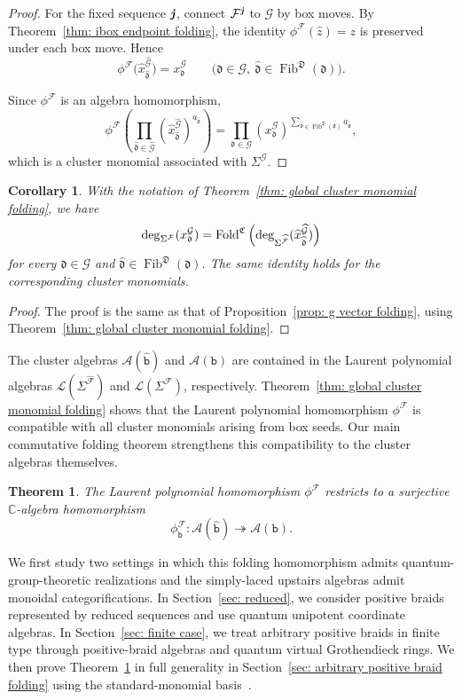 \documentclass[12pt, leqno]{amsart}
\numberwithin{equation}{section}
\theoremstyle{plain}
\newtheorem{theorem}[lemma]{Theorem}
\newtheorem{corollary}[lemma]{Corollary}
\theoremstyle{definition}
\newcommand{\C}{\mathbb{C}}
\newcommand{\Fold}{{\rm Fold}}
\newcommand{\jj}{ \textbf{\textit{j}}}
\newcommand{\Fib}{\operatorname{Fib}}
\newcommand{\hx}{\widehat{x}}
\newcommand{\hz}{\widehat{z}}
\newcommand{\frakC}{\mathfrak{C}}
\newcommand{\frakD}{\mathfrak{D}}
\newcommand{\frakd}{\mathfrak{d}}
\newcommand{\hfrakd}{\widehat{\frakd}}
\newcommand{\calA}{\mathcal{A}}
\newcommand{\calF}{\mathcal{F}}
\newcommand{\calG}{\mathcal{G}}
\newcommand{\calL}{\mathcal{L}}
\newcommand{\hcalF}{{\widehat{\calF}}}
\newcommand{\hcalG}{{\widehat{\calG}}}
\newcommand{\ttb}{\mathtt{b}}
\newcommand{\httb}{\widehat{\ttb}}
\begin{document}
\begin{proof}
For the fixed sequence $\jj$, connect $\calF^\jj$ to $\calG$ by box moves. 
By Theorem~\ref{thm: ibox endpoint folding},  the identity $\phi^\calF(\hz)=z$ is preserved{} under each box move.
Hence
\[
\phi^\calF\bigl(\hx^\hcalG_{\hfrakd}\bigr) =x^\calG_{\frakd}
\qquad
\bigl(\frakd\in\calG,\ \hfrakd\in\Fib^\frakD(\frakd) \bigr).
\]

Since $\phi^\calF$ is an algebra homomorphism,
\[
\phi^\calF\left(\prod_{\hfrakd\in\hcalG}(\hx_{\hfrakd}^{\hcalG})^{a_{\hfrakd}}\right)
= \prod_{\frakd\in\calG} (x_{\frakd}^{\calG})^{\sum_{\hfrakd\in\Fib^\frakD(\frakd)}a_{\hfrakd}},
\]
which is a cluster monomial associated with $\Sigma^\calG$.
\end{proof}

\begin{corollary}\label{cor: global g-vector folding}
With the notation of
Theorem~\ref{thm: global cluster monomial folding}, we have
\[
\deg_{\Sigma^\calF}(x_{\frakd}^{\calG})=\Fold^{\frakC}\left(\deg_{\Sigma^\hcalF}(\hx_{\hfrakd}^{\hcalG})\right)
\]
for every $\frakd\in\calG$ and
$\hfrakd\in\Fib^{\frakD}(\frakd)$.
The same identity holds for the corresponding cluster monomials.
\end{corollary}

\begin{proof}
The proof is the same as that of
Proposition~\ref{prop: g vector folding}, using
Theorem~\ref{thm: global cluster monomial folding}.
\end{proof}

The cluster algebras $\calA(\httb)$ and $\calA(\ttb)$ are
contained in the Laurent polynomial algebras
$\calL(\Sigma^\hcalF)$ and $\calL(\Sigma^\calF)$,
respectively.  Theorem~\ref{thm: global cluster monomial folding}
shows that the Laurent polynomial homomorphism $\phi^\calF$ is
compatible with all cluster monomials arising from box seeds.
Our main commutative folding theorem strengthens this compatibility
to the cluster algebras themselves.

\begin{theorem}\label{thm: cluster algebra folding}
The Laurent polynomial homomorphism $\phi^\calF$ restricts to a
surjective $\C$-algebra homomorphism
\[
\phi^\calF_\ttb:
\calA(\httb)\twoheadrightarrow\calA(\ttb).
\]
\end{theorem}

We first study two settings in which this folding homomorphism admits
quantum-group-theoretic realizations and the simply-laced upstairs
algebras admit monoidal categorifications.  In
Section~\ref{sec: reduced}, we consider positive braids represented
by reduced sequences and use quantum unipotent coordinate algebras.
In Section~\ref{sec: finite case}, we treat arbitrary positive braids
in finite type through positive-braid algebras and quantum virtual
Grothendieck rings.  We then prove
Theorem~\ref{thm: cluster algebra folding} in full generality in
Section~\ref{sec: arbitrary positive braid folding} using the
standard-monomial basis~\cite{Qin24B}.
\end{document}

